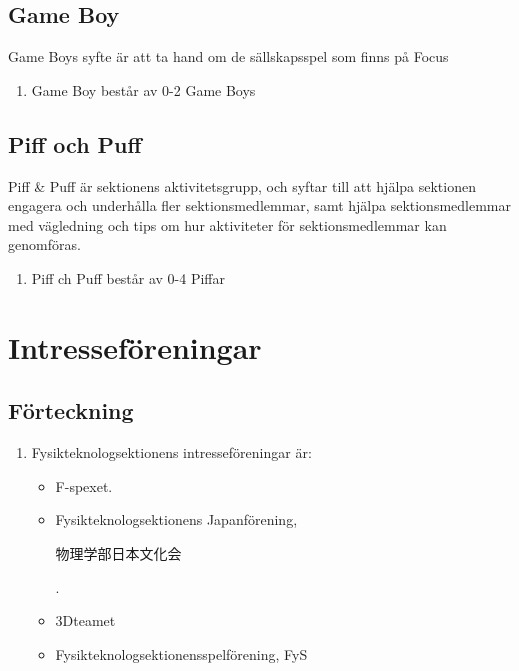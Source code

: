 \documentclass[11pt,a4paper]{article}
\begin{document}
\subsection{Game Boy}
Game Boys syfte är att ta hand om de sällskapsspel som finns på Focus
\begin{enumerate}[\thesubsection .1]

	\item Game Boy består av 0-2 Game Boys
	
\end{enumerate}

\subsection{Piff och Puff}
Piff & Puff är sektionens aktivitetsgrupp, och syftar till att hjälpa sektionen engagera och underhålla fler sektionsmedlemmar, samt hjälpa sektionsmedlemmar med vägledning och tips om hur aktiviteter för sektionsmedlemmar kan genomföras.

\begin{enumerate}[\thesubsection .1]

	\item Piff ch Puff består av 0-4 Piffar
	
\end{enumerate}

\newpage


\section{Intresseföreningar}

\subsection{Förteckning}

\begin{enumerate}[\thesubsection .1]

  \item Fysikteknologsektionens intresseföreningar är:
    \begin{itemize}
    \item F-spexet.
    \item Fysikteknologsektionens Japanförening, \begin{CJK}{UTF8}{min}物理学部日本文化会\end{CJK} .
    \item 3Dteamet
    \item Fysikteknologsektionensspelförening, FyS
    \end{itemize}
\end{enumerate}
\end{document}
